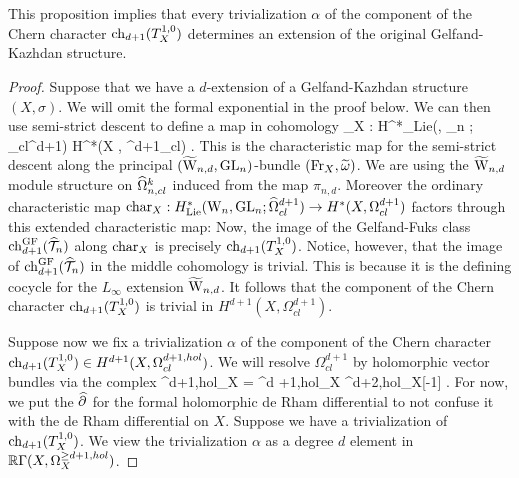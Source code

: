 \documentclass[10pt]{amsart}
\begin{document}
This proposition implies that every trivialization $\alpha$ of the component of the Chern character $\ch_{d+1}(T_X^{1,0})$ determines an extension of the original Gelfand-Kazhdan structure. 

\begin{proof}
Suppose that we have a $d$-extension of a Gelfand-Kazhdan structure $(X,\sigma)$.
We will omit the formal exponential in the proof below.
We can then use semi-strict descent to define a map in cohomology
\ben
{}_X : H^*_{\rm Lie}(\TVectd, \GL_n ; \hOmega_{cl}^{d+1}) \to H^*(X , \Omega^{d+1}_{cl}) .
\een
This is the characteristic map for the semi-strict descent along the principal $(\TVectd,\GL_n)$-bundle $(\Fr_X , \Tilde{\omega})$.
We are using the $\TVectd$ module structure on $\hOmega^k_{n,cl}$ induced from the map $\pi_{n,d}$. 
Moreover the ordinary characteristic map ${\rm char}_X : H^*_{\rm Lie}(\Vect, \GL_n ; \hOmega_{cl}^{d+1}) \to H^*(X , \Omega^{d+1}_{cl})$ factors through this extended characteristic map:
\ben
{}
\een
Now, the image of the Gelfand-Fuks class $\ch_{d+1}^{\GF} (\hT_n)$ along ${\rm char}_X$ is precisely $\ch_{d+1}(T_X^{1,0})$. 
Notice, however, that the image of $\ch_{d+1}^\GF(\hT_n)$ in the middle cohomology is trivial.
This is because it is the defining cocycle for the $L_\infty$ extension $\TVectd$. 
It follows that the component of the Chern character $\ch_{d+1}(T_X^{1,0})$ is trivial in $H^{d+1}(X, \Omega^{d+1}_{cl})$. 

Suppose now we fix a trivialization $\alpha$ of the component of the Chern character $\ch_{d+1}(T_X^{1,0}) \in H^{d+1}(X, \Omega^{d+1, hol}_{cl})$.
We will resolve $\Omega^{d+1}_{cl}$ by holomorphic vector bundles via the complex
\ben
\Omega^{\geq d+1,hol}_X = \Omega^{d +1,hol}_X \xto{\Hat{\partial}} \Omega^{d+2,hol}_X[-1] \cdots .
\een
For now, we put the $\Hat{\partial}$ for the formal holomorphic de Rham differential to not confuse it with the de Rham differential on $X$.
Suppose we have a trivialization of $\ch_{d+1}(T_X^{1,0})$.
We view the trivialization $\alpha$ as a degree $d$ element in $\RR \Gamma(X, \Omega^{\geq d+1, hol}_X)$. 


\end{proof}
\end{document}

